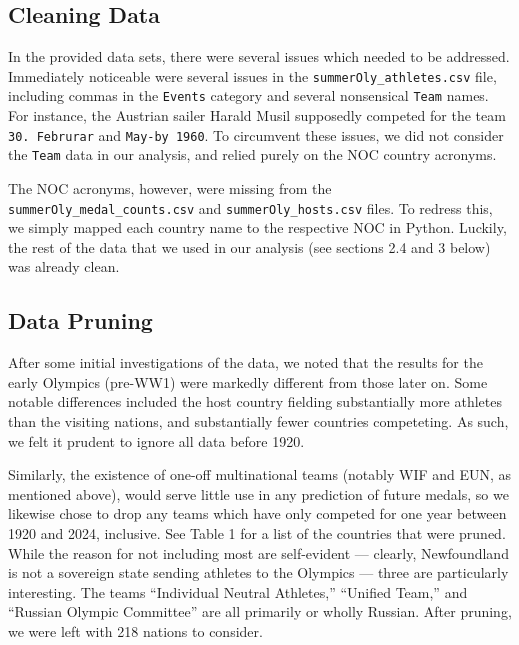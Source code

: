 \documentclass[12pt]{article}
\begin{document}
\subsection{Cleaning Data}
In the provided data sets, there were several issues which needed to be addressed.
Immediately noticeable were several issues in the \verb|summerOly_athletes.csv| file, including commas in the \verb|Events| category and several nonsensical \verb|Team| names. 
For instance, the Austrian sailer Harald Musil supposedly competed for the team \verb|30. Februrar| and \verb|May-by 1960|. 
To circumvent these issues, we did not consider the \verb|Team| data in our analysis, and relied purely on the NOC country acronyms.

The NOC acronyms, however, were missing from the \verb|summerOly_medal_counts.csv| and \verb|summerOly_hosts.csv| files. 
To redress this, we simply mapped each country name to the respective NOC in Python. 
Luckily, the rest of the data that we used in our analysis (see sections 2.4 and 3 below) was already clean.

\subsection{Data Pruning}
After some initial investigations of the data, we noted that the results for the early Olympics (pre-WW1) were markedly different from those later on.
Some notable differences included the host country fielding substantially more athletes than the visiting nations, and substantially fewer countries competeting.
As such, we felt it prudent to ignore all data before 1920.

Similarly, the existence of one-off multinational teams (notably WIF and EUN, as mentioned above), would serve little use in any prediction of future medals, so we likewise chose to drop any teams which have only competed for one year between 1920 and 2024, inclusive.
See Table 1 for a list of the countries that were pruned. 
While the reason for not including most are self-evident — clearly, Newfoundland is not a sovereign state sending athletes to the Olympics — three are particularly interesting.
The teams ``Individual Neutral Athletes,'' ``Unified Team,'' and ``Russian Olympic Committee'' are all primarily or wholly Russian. After pruning, we were left with 218 nations to consider. 
\end{document}
